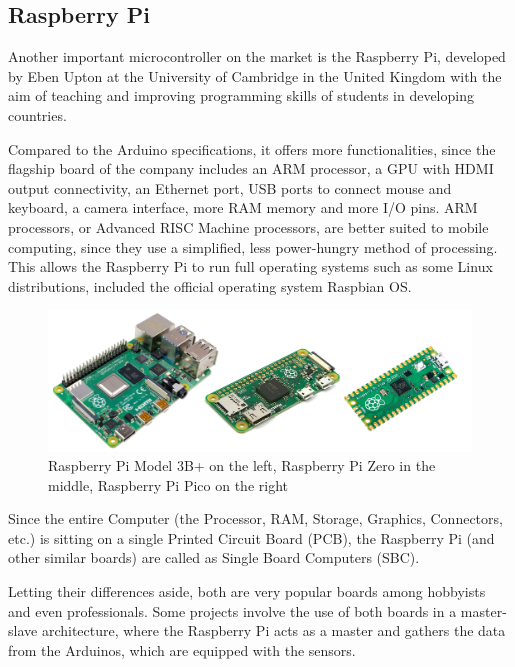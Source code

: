 		\subsection{Raspberry Pi}
	
			Another important microcontroller on the market is the Raspberry Pi, developed by Eben Upton at the University of Cambridge in the United Kingdom with the aim of teaching and improving programming skills of students in developing countries.
			
			Compared to the Arduino specifications, it offers more functionalities, since the flagship board of the company includes an ARM processor, a GPU with HDMI output connectivity, an Ethernet port, USB ports to connect mouse and keyboard, a camera interface, more RAM memory and more I/O pins.
			ARM processors, or Advanced RISC Machine processors, are better suited to mobile computing, since they use a simplified, less power-hungry method of processing.
			This allows the Raspberry Pi to run full operating systems such as some Linux distributions, included the official operating system Raspbian OS.
			
			\begin{figure}[h]
				\centering
				\includegraphics[width=\textwidth]{resources/img/chap3/raspberry_types}
				\caption{Raspberry Pi Model 3B+ on the left, Raspberry Pi Zero in the middle, Raspberry Pi Pico on the right}
				\label{img:raspberry_board}
			\end{figure}
			
			Since the entire Computer (the Processor, RAM, Storage, Graphics, Connectors, etc.) is sitting on a single Printed Circuit Board (PCB), the Raspberry Pi (and other similar boards) are called as Single Board Computers (SBC).
			
			Letting their differences aside, both are very popular boards among hobbyists and even professionals.
			Some projects involve the use of both boards in a master-slave architecture, where the Raspberry Pi acts as a master and gathers the data from the Arduinos, which are equipped with the sensors.
			
